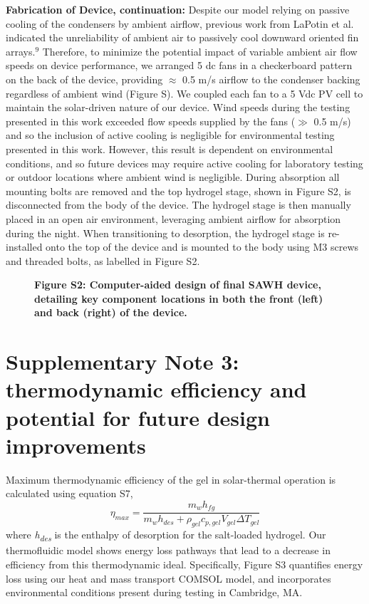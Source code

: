 \documentclass[11pt]{article}
\newcommand{\figbox}[1]{%
  \fbox{\parbox[c][#1][c]{0.92\textwidth}{\centering\itshape [figure image]}}}
\begin{document}
\textbf{Fabrication of Device, continuation:} Despite our model relying on passive cooling of the condensers by ambient airflow, previous work from LaPotin et al. indicated the unreliability of ambient air to passively cool downward oriented fin arrays.$^{9}$ Therefore, to minimize the potential impact of variable ambient air flow speeds on device performance, we arranged 5 dc fans in a checkerboard pattern on the back of the device, providing $\approx$ 0.5 m/s airflow to the condenser backing regardless of ambient wind (Figure S). We coupled each fan to a 5 Vdc PV cell to maintain the solar-driven nature of our device. Wind speeds during the testing presented in this work exceeded flow speeds supplied by the fans ($\gg$ 0.5 m/s) and so the inclusion of active cooling is negligible for environmental testing presented in this work. However, this result is dependent on environmental conditions, and so future devices may require active cooling for laboratory testing or outdoor locations where ambient wind is negligible. During absorption all mounting bolts are removed and the top hydrogel stage, shown in Figure S2, is disconnected from the body of the device. The hydrogel stage is then manually placed in an open air environment, leveraging ambient airflow for absorption during the night. When transitioning to desorption, the hydrogel stage is re-installed onto the top of the device and is mounted to the body using M3 screws and threaded bolts, as labelled in Figure S2.

\begin{figure}[!ht]
\centering
\figbox{7cm}
\caption*{\textbf{Figure S2: Computer-aided design of final SAWH device, detailing key component locations in both the front (left) and back (right) of the device.}}
\end{figure}

\section{Supplementary Note 3: thermodynamic efficiency and potential for future design improvements}

Maximum thermodynamic efficiency of the gel in solar-thermal operation is calculated using equation S7,
\begin{equation}
\eta_{max} = \frac{m_{w}h_{fg}}{m_{w}h_{des} + \rho_{gel}c_{p,gel}V_{gel}\Delta T_{gel}}
\end{equation}
where \textit{h\textsubscript{des}} is the enthalpy of desorption for the salt-loaded hydrogel. Our thermofluidic model shows energy loss pathways that lead to a decrease in efficiency from this thermodynamic ideal. Specifically, Figure S3 quantifies energy loss using our heat and mass transport COMSOL model, and incorporates environmental conditions present during testing in Cambridge, MA.
\end{document}
